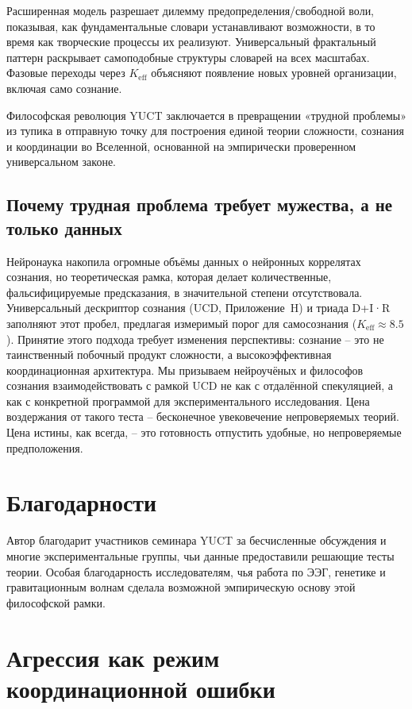 \documentclass[12pt,a4paper]{article}
\newcommand{\eff}{\mathrm{eff}}
\newcommand{\Ke}{K_{\eff}}
\begin{document}
	Расширенная модель разрешает дилемму предопределения/свободной воли, показывая, как фундаментальные словари устанавливают возможности, в то время как творческие процессы их реализуют. Универсальный фрактальный паттерн раскрывает самоподобные структуры словарей на всех масштабах. Фазовые переходы через $\Ke$ объясняют появление новых уровней организации, включая само сознание.
	
	Философская революция YUCT заключается в превращении «трудной проблемы» из тупика в отправную точку для построения единой теории сложности, сознания и координации во Вселенной, основанной на эмпирически проверенном универсальном законе.
	
	\subsection{Почему трудная проблема требует мужества, а не только данных}
	\label{subsec:courage-consciousness}
	
	Нейронаука накопила огромные объёмы данных о нейронных коррелятах сознания, но теоретическая рамка, которая делает количественные, фальсифицируемые предсказания, в значительной степени отсутствовала. Универсальный дескриптор сознания (UCD, Приложение~H) и триада D+I·R заполняют этот пробел, предлагая измеримый порог для самосознания ($K_{\mathrm{eff}} \approx 8.5$). Принятие этого подхода требует изменения перспективы: сознание – это не таинственный побочный продукт сложности, а высокоэффективная координационная архитектура. Мы призываем нейроучёных и философов сознания взаимодействовать с рамкой UCD не как с отдалённой спекуляцией, а как с конкретной программой для экспериментального исследования. Цена воздержания от такого теста – бесконечное увековечение непроверяемых теорий. Цена истины, как всегда, – это готовность отпустить удобные, но непроверяемые предположения.
	
	\section*{Благодарности}
	
	Автор благодарит участников семинара YUCT за бесчисленные обсуждения и многие экспериментальные группы, чьи данные предоставили решающие тесты теории. Особая благодарность исследователям, чья работа по ЭЭГ, генетике и гравитационным волнам сделала возможной эмпирическую основу этой философской рамки.
	
	\section{Агрессия как режим координационной ошибки}
	
\end{document}
